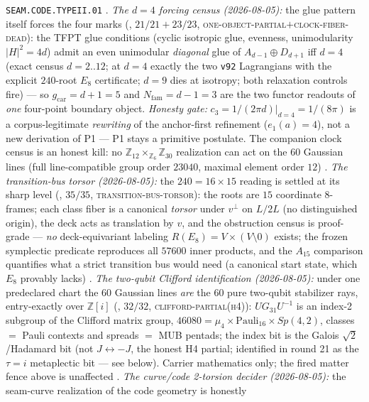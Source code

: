 \documentclass[11pt,a4paper]{article}
\newcommand{\gcar}{g_{\mathrm{car}}}
\newcommand{\Nfam}{N_{\mathrm{fam}}}
\newcommand{\Z}{\mathbb{Z}}
\theoremstyle{definition}
\begin{document}
\begin{keybox}
\texttt{SEAM.CODE.TYPEII.01} \mC.
\emph{The $d=4$ forcing census (2026-08-05):} the glue pattern
itself forces the four marks
(, $21/21+23/23$,
\textsc{one-object-partial}$+$\textsc{clock-fiber-dead}): the TFPT
glue conditions (cyclic isotropic glue, evenness, unimodularity
$|H|^2=4d$) admit an even unimodular \emph{diagonal} glue of
$A_{d-1}\oplus D_{d+1}$ iff $d=4$ (exact census $d=2..12$; at
$d=4$ exactly the two \texttt{v92} Lagrangians with the explicit
$240$-root $E_8$ certificate; $d=9$ dies at isotropy; both
relaxation controls fire) --- so $\gcar=d{+}1=5$ and
$\Nfam=d{-}1=3$ are the two functor readouts of \emph{one}
four-point boundary object.  \emph{Honesty gate:}
$c_3=1/(2\pi d)|_{d=4}=1/(8\pi)$ is a corpus-legitimate
\emph{rewriting} of the anchor-first refinement ($e_1(a)=4$), not
a new derivation of P1 --- P1 stays a primitive postulate.  The
companion clock census is an honest kill: no
$\Z_{12}\times_{\Z_6}\Z_{30}$ realization can act on the $60$
Gaussian lines (full line-compatible group order $23040$, maximal
element order $12$) \mE.
\emph{The transition-bus torsor (2026-08-05):} the $240=16\times15$
reading is settled at its sharp level
(, $35/35$,
\textsc{transition-bus-torsor}): the roots are $15$ coordinate
$8$-frames; each class fiber is a canonical \emph{torsor} under
$v^\perp$ on $L/2L$ (no distinguished origin), the deck acts as
translation by $v$, and the obstruction census is proof-grade ---
\emph{no} deck-equivariant labeling $R(E_8)=V\times(V\setminus0)$
exists; the frozen symplectic predicate reproduces all $57600$
inner products, and the $A_{15}$ comparison quantifies what a
strict transition bus would need (a canonical start state, which
$E_8$ provably lacks) \mE.
\emph{The two-qubit Clifford identification (2026-08-05):} under
one predeclared chart the $60$ Gaussian lines \emph{are} the $60$
pure two-qubit stabilizer rays, entry-exactly over $\Z[i]$
(, $32/32$,
\textsc{clifford-partial(h4)}): $UG_{31}U^{-1}$ is an index-2
subgroup of the Clifford matrix group,
$46080=\mu_4\times\mathrm{Pauli}_{16}\times Sp(4,2)$, classes $=$
Pauli contexts and spreads $=$ MUB pentads; the index bit is the
Galois $\sqrt2$/Hadamard bit (not $J\leftrightarrow-J$, the honest
H4 partial; identified in round 21 as the $\tau=i$ metaplectic bit
--- see below).  Carrier mathematics only; the fired matter fence
above is unaffected \mE.
\emph{The curve/code 2-torsion decider (2026-08-05):} the
seam-curve realization of the code geometry is honestly

\end{keybox}
\end{document}
